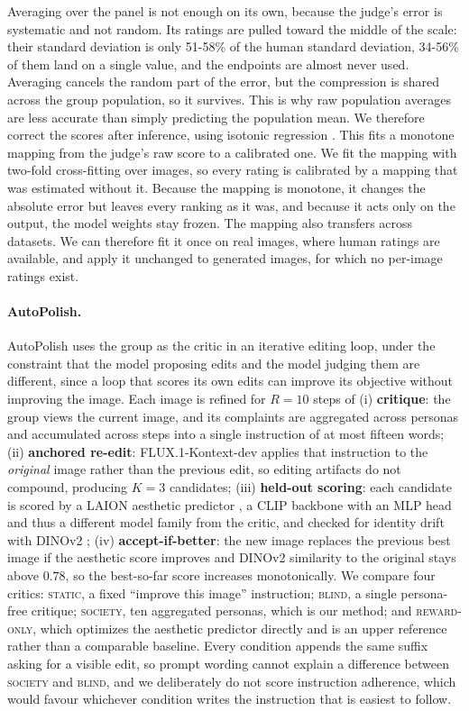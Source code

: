 \documentclass[10pt,twocolumn,letterpaper]{article}
\begin{document}
Averaging over the panel is not enough on its own, because the judge's error is systematic and not random. Its ratings are pulled toward the middle of the scale: their standard deviation is only 51-58\% of the human standard deviation, 34-56\% of them land on a single value, and the endpoints are almost never used. Averaging cancels the random part of the error, but the compression is shared across the group population, so it survives. This is why raw population averages are less accurate than simply predicting the population mean. We therefore correct the scores after inference, using isotonic regression \citep{niculescu2005}. This fits a monotone mapping from the judge's raw score to a calibrated one. We fit the mapping with two-fold cross-fitting over images, so every rating is calibrated by a mapping that was estimated without it. Because the mapping is monotone, it changes the absolute error but leaves every ranking as it was, and because it acts only on the output, the model weights stay frozen. The mapping also transfers across datasets. We can therefore fit it once on real images, where human ratings are available, and apply it unchanged to generated images, for which no per-image ratings exist.

\paragraph{AutoPolish.} AutoPolish uses the group as the critic in an iterative editing loop, under the constraint that the model proposing edits and the model judging them are different, since a loop that scores its own edits can improve its objective without improving the image. Each image is refined for $R=10$ steps of (i) \textbf{critique}: the group views the current image, and its complaints are aggregated across personas and accumulated across steps into a single instruction of at most fifteen words; (ii) \textbf{anchored re-edit}: FLUX.1-Kontext-dev \citep{flux2024} applies that instruction to the \emph{original} image rather than the previous edit, so editing artifacts do not compound, producing $K=3$ candidates; (iii) \textbf{held-out scoring}: each candidate is scored by a LAION aesthetic predictor \citep{schuhmann2022}, a CLIP \citep{radford2021} backbone with an MLP head and thus a different model family from the critic, and checked for identity drift with DINOv2 \citep{oquab2023}; (iv) \textbf{accept-if-better}: the new image replaces the previous best image if the aesthetic score improves and DINOv2 similarity to the original stays above $0.78$, so the best-so-far score increases monotonically. We compare four critics: \textsc{static}, a fixed ``improve this image'' instruction; \textsc{blind}, a single persona-free critique; \textsc{society}, ten aggregated personas, which is our method; and \textsc{reward-only}, which optimizes the aesthetic predictor directly and is an upper reference rather than a comparable baseline. Every condition appends the same suffix asking for a visible edit, so prompt wording cannot explain a difference between \textsc{society} and \textsc{blind}, and we deliberately do not score instruction adherence, which would favour whichever condition writes the instruction that is easiest to follow.
\end{document}
